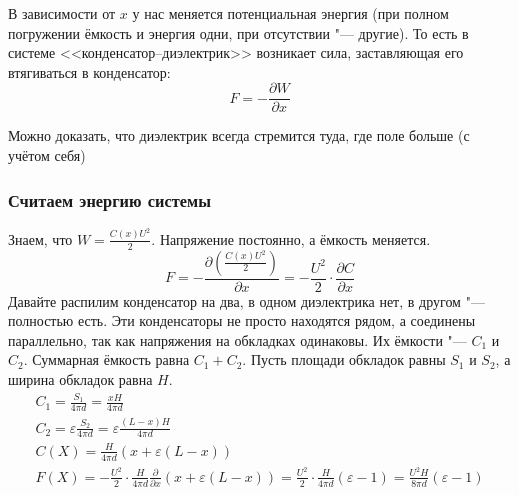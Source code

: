     В зависимости от $x$ у нас меняется потенциальная энергия (при полном погружении ёмкость и энергия одни,
    при отсутствии "--- другие).
    То есть в системе <<конденсатор--диэлектрик>> возникает сила, заставляющая его втягиваться в конденсатор:
    \[ F = - \frac{\partial W}{\partial x} \]
    \begin{Rem}
      Можно доказать, что диэлектрик всегда стремится туда, где поле больше (с учётом себя)
    \end{Rem}

    \subsubsection{Считаем энергию системы}
      Знаем, что $W = \frac{C(x)U^2}{2}$.
      Напряжение постоянно, а ёмкость меняется.
      \[F = -\frac{\partial\left(\frac{C(x)U^2}{2}\right)}{\partial x} = -\frac{U^2}{2} \cdot \frac{\partial C}{\partial x}\]
      Давайте распилим конденсатор на два, в одном диэлектрика нет, в другом "--- полностью есть.
      Эти конденсаторы не просто находятся рядом, а соединены параллельно, так как напряжения на обкладках одинаковы.
      Их ёмкости "--- $C_1$ и $C_2$.
      Суммарная ёмкость равна $C_1+C_2$.
      Пусть площади обкладок равны $S_1$ и $S_2$, а ширина обкладок равна $H$.
      \begin{gather*}
      C_1=\frac{S_1}{4\pi d} = \frac{xH}{4\pi d} \\
      C_2=\varepsilon\frac{S_2}{4\pi d} = \varepsilon\frac{(L-x)H}{4\pi d} \\
      C(X) = \frac{H}{4\pi d}(x+\varepsilon(L-x)) \\
      F(X) = -\frac{U^2}{2} \cdot \frac{H}{4\pi d} \frac{\partial}{\partial x}(x + \varepsilon(L-x))
           = \frac{U^2}{2} \cdot \frac{H}{4\pi d}(\varepsilon-1)
           = \frac{U^2H}{8\pi d} (\varepsilon-1)
      \end{gather*}

